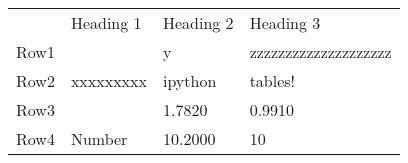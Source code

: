 \documentclass[a4paper,10pt]{article}
\title{}
\author{}
\begin{document}
\newlength{\Oldarrayrulewidth}
\newcommand{\thickline}[2]{%
  \noalign{\global\setlength{\Oldarrayrulewidth}{\arrayrulewidth}}%
  \noalign{\global\setlength{\arrayrulewidth}{#1}}\cline{#2}%
  \noalign{\global\setlength{\arrayrulewidth}{\Oldarrayrulewidth}}}

\begin{tabular}{|l|l|l|l|}
\cline{1-2}\cline{4-4} & Heading 1 & Heading 2 & Heading 3 \\  \cline{1-4}
Row1 & \multirow{3}{*}{xxxxxxxxx} & y & zzzzzzzzzzzzzzzzzzzz \\  \cline{1-1}\cline{4-4}
Row2 &  & ipython & tables! \\  \cline{1-1}\cline{4-4}
Row3 &  & 1.7820 & 0.9910 \\  \cline{1-4}
Row4 & Number & 10.2000 & 10 \\  \cline{1-4}
\end{tabular}
\end{document}
